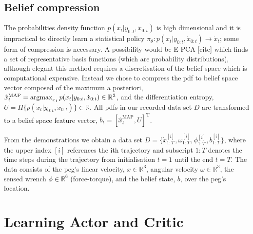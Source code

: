 \subsection{Belief compression}

The probabilities density function $p(x_t|y_{0:t},\dot{x}_{0:t})$ is high dimensional and it is 
impractical to directly learn a statistical policy $\pi_{\theta} : p(x_t|y_{0:t},\dot{x}_{0:t}) \rightarrow \dot{x}_t$; 
some form of compression is necessary. A possibility would be E-PCA [cite] which finds a set of 
representative basis functions (which are probability distributions), although elegant this method 
requires a discretisation of the belief space which is computational expensive. Instead we chose to 
compress the pdf to belief space vector composed of the maximum a posteriori, $\hat{x}^{\mathrm{MAP}}_t = \argmax_{x_t} p(x_t|y_{0:t},\dot{x}_{0:t}) \in \mathbb{R}^3$, and the differentiation entropy, 
$U = H\{p(x_t|y_{0:t},\dot{x}_{0:t})\} \in \mathbb{R}$. All pdfs in our recorded data set $D$ are transformed to 
a belief space feature vector, $b_t = [\hat{x}^{\mathrm{MAP}}_t,U]^{\mathrm{T}}$. 

From the demonstrations we obtain a data set $D=\{\dot{x}^{[i]}_{1:T},\omega^{[i]}_{1:T},\phi^{[i]}_{1:T},b^{[i]}_{1:T}\}$, 
where the upper index $[i]$ references the ith trajectory and subscript $1:T$ denotes the time steps during the trajectory
from initialisation $t=1$ until the end $t=T$. The data consists of the peg's linear velocity, $\dot{x} \in \mathbb{R}^3$, 
angular velocity $\omega \in \mathbb{R}^3$, the sensed wrench $\phi \in \mathbb{R}^6$ (force-torque),
and the belief state, $b$, over the peg's location.



\section{Learning Actor and Critic}\label{sec:learning-value-actor}

